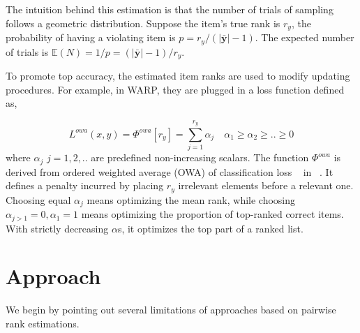 \documentclass[letterpaper]{article} %
\begin{document}
The intuition behind this estimation is that the number of trials of sampling follows a geometric distribution. Suppose the item's true rank is $r_y$, the probability of having a violating item is $p = r_y / (|\bar{\textbf{y}}| - 1)$. The expected number of trials is $\mathbb{E}(N) = 1/p=(|\bar{\textbf{y}}| - 1)/r_y$.

To promote top accuracy, the estimated item ranks are used to modify updating procedures. For example, in WARP, they are plugged in a loss function defined as, %

\begin{equation}
\label{eq:owc}
L^{owa}(x,y) = \Phi^{owa}[r_y] = \sum_{j=1}^{r_y} \alpha_j \quad \alpha_1\ge \alpha_2\ge..\ge 0
\end{equation}
where $\alpha_j$ $j=1,2,..$ are predefined non-increasing scalars. The function $\Phi^{owa}$ is derived from ordered weighted average (OWA) of classification loss ~\cite{yager1988ordered} in ~\cite{usunier2009ranking}. It defines a penalty incurred by placing $r_y$ irrelevant elements before a relevant one. Choosing equal $\alpha_j$ means optimizing the mean rank, while choosing $\alpha_{j>1}=0, \alpha_1=1$ means optimizing the proportion of top-ranked correct items. With strictly decreasing $\alpha$s, it optimizes the top part of a ranked list.

\section{Approach}
\label{sec:method}
We begin by pointing out several limitations of approaches based on pairwise rank estimations.
\end{document}
